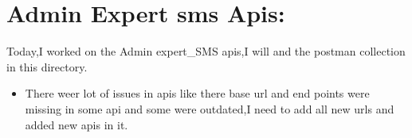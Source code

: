 \documentclass[12pt,a4paper]{article}
\begin{document}
	
 
 \clearpage
\section{Admin Expert sms Apis:}
Today,I worked on the Admin expert\_SMS apis,I will and the postman collection in this directory.
\begin{itemize}
    \item There weer lot of issues in apis like there base url and end points were missing in some api and some were outdated,I need to add all new urls and added new apis in it.
\end{itemize}
\end{document}
